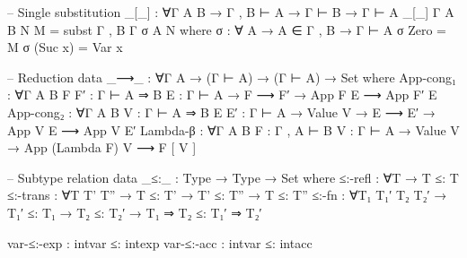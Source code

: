\documentclass{article}
\begin{document}
\begin{prev}
\begin{code}
-- Single substitution
_[_] : ∀{Γ A B} → Γ , B ⊢ A → Γ ⊢ B → Γ ⊢ A
_[_] {Γ} {A} {B} N M = subst {Γ , B} {Γ} σ {A} N
    where
    σ : ∀ {A} → A ∈ Γ , B → Γ ⊢ A
    σ Zero = M
    σ (Suc x) = Var x

-- Reduction
data _⟶_ : ∀{Γ A} → (Γ ⊢ A) → (Γ ⊢ A) → Set where
    App-cong₁ : ∀{Γ A B} {F F′ : Γ ⊢ A ⇒ B} {E : Γ ⊢ A} → F ⟶ F′ → App F E ⟶ App F′ E
    App-cong₂ : ∀{Γ A B} {V : Γ ⊢ A ⇒ B} {E E′ : Γ ⊢ A} → Value V → E ⟶ E′ → App V E ⟶ App V E′
    Lambda-β : ∀{Γ A B} {F : Γ , A ⊢ B} {V : Γ ⊢ A} → Value V → App (Lambda F) V ⟶ F [ V ]

-- Subtype relation
data _≤:_ : Type → Type → Set where
    ≤:-refl : ∀{T} → T ≤: T
    ≤:-trans : ∀{T T' T''} → T ≤: T' → T' ≤: T'' → T ≤: T''
    ≤:-fn : ∀{T₁ T₁′ T₂ T₂′} → T₁′ ≤: T₁ → T₂ ≤: T₂′ → T₁ ⇒ T₂ ≤: T₁′ ⇒ T₂′

    var-≤:-exp : intvar ≤: intexp
    var-≤:-acc : intvar ≤: intacc
\end{code}
\end{prev}
\end{document}
